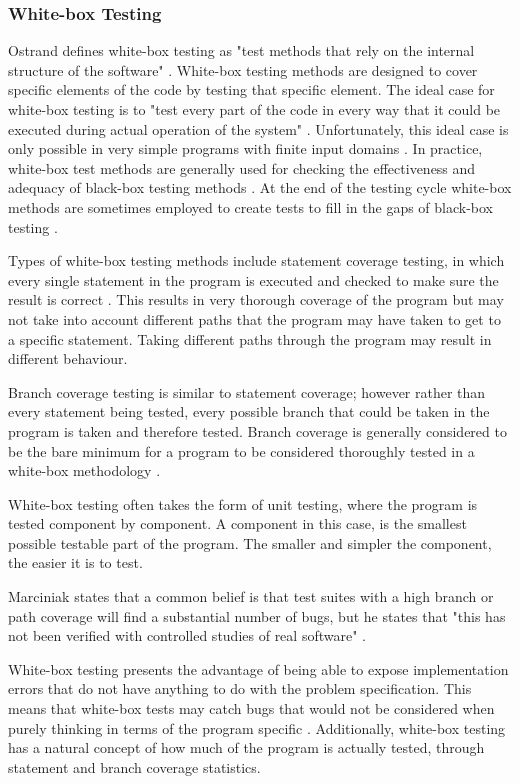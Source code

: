 \subsubsection{White-box Testing \label{whitebox}}
Ostrand defines white-box testing as "test methods that rely on the internal structure of the software" \cite{ostrand}. White-box testing methods are designed to cover specific elements of the code by testing that specific element. The ideal case for white-box testing is to "test every part of the code in every way that it could be executed during actual operation of the system"  \cite{enc2}. Unfortunately, this ideal case is only possible in very simple programs with finite input domains \cite{enc2}. In practice, white-box test methods are generally used for checking the effectiveness and adequacy of black-box testing methods \cite{enc2}. At the end of the testing cycle white-box methods are sometimes employed to create tests to fill in the gaps of black-box testing \cite{ostrand}. 

Types of white-box testing methods include statement coverage testing, in which every single statement in the program is executed and checked to make sure the result is correct \cite{enc2}. This results in very thorough coverage of the program but may not take into account different paths that the program may have taken to get to a specific statement. Taking different paths through the program may result in different behaviour.

 Branch coverage testing is similar to statement coverage; however rather than every statement being tested, every possible branch that could be taken in the program is taken and therefore tested. Branch coverage is generally considered to be the bare minimum for a program to be considered thoroughly tested in a white-box methodology \cite{enc2}.

White-box testing often takes the form of unit testing, where the program is tested component by component. A component in this case, is the smallest possible testable part of the program. The smaller and simpler the component, the easier it is to test. 

Marciniak states that a common belief is that test suites with a high branch or path coverage will find a substantial number of bugs, but he states that "this has not been verified with controlled studies of real software" \cite {enc2}.

White-box testing presents the advantage of  being able to expose implementation errors that do not have anything to do with the problem specification. This means that white-box tests may catch bugs that would not be considered when purely thinking in terms of the program specific \cite{enc2}. Additionally, white-box testing has a natural concept of how much of the program is actually tested, through statement and branch coverage statistics.

